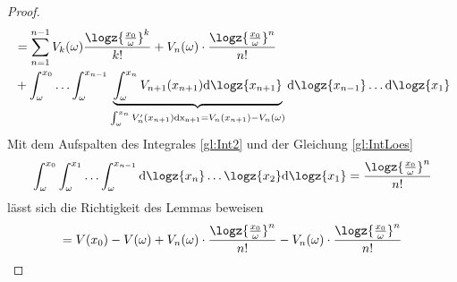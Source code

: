 \begin{lemma}
\begin{proof}
\begin{align}
&=\sum_{n=1}^{n-1} V_k(\omega) \frac{\logz{\frac{x_0}{\omega}}^k}{k!} + V_n(\omega) \cdot \frac{\logz{\frac{x_0}{\omega}}^n}{n!}\\
&+ \int_\omega^{x_0} \hdots \int_{\omega}^{x_{n-1}}\underbrace{\int_{\omega}^{x_{n}} V_{n+1}(x_{n+1}) \mathrm{d}\logz{x_{n+1}}}_{\int_{\omega}^{x_n} V'_n(x_{n+1}) \mathrm{dx_{n+1}} = V_n(x_{n+1}) - V_n(\omega)} \mathrm{d} \logz{x_{n-1}} \hdots \mathrm{d} \logz{x_1}\label{gl:Int2} 
\end{align}
Mit dem Aufspalten des Integrales \ref{gl:Int2} und der Gleichung \ref{gl:IntLoes}
\begin{align}
\int_\omega^{x_0} \int_{\omega}^{x_1} \hdots \int_{\omega}^{x_{n-1}} \mathrm{d} \logz{x_{n}} \hdots \logz{x_2} \mathrm{d} \logz{x_1} = \frac{\logz{\frac{x_0}{\omega}}^n}{n!}\label{gl:IntLoes} 
\end{align}
lässt sich die Richtigkeit des Lemmas beweisen
\begin{align}
=V(x_0) - V(\omega) + V_n(\omega) \cdot \frac{\logz{\frac{x_0}{\omega}}^n}{n!} - V_n(\omega) \cdot \frac{\logz{\frac{x_0}{\omega}}^n}{n!} 
\end{align}
\end{proof}
\end{lemma}
